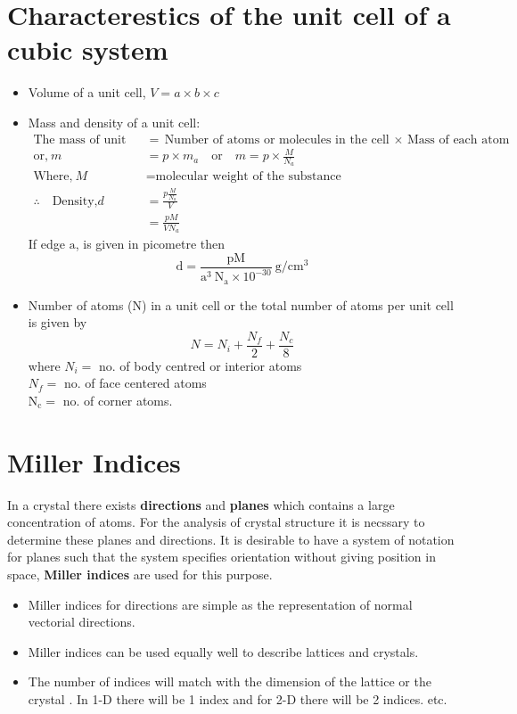 \section{Characterestics of the unit cell of a cubic system}
\begin{itemize}
	\item  Volume of a unit cell, $V=a \times b \times c$
	\item Mass and density of a unit cell:
	\begin{align*}
	\text{The mass of unit cell} &= \text{Number of atoms or molecules in the cell $\times$ Mass of each atom}\\
	\text{or,}\ m&=p \times m_{a}\quad \text{or}\quad  m=p \times \frac{M}{N_{a}} \\
	\text{Where,}\ M&= \text{molecular weight of the substance}\\
	\therefore \quad \text{Density,} d&=\frac{p \frac{M}{N_{a}}}{V}\\&=\frac{p M}{V N_{a}}
	\end{align*}
	If edge $\mathrm{a}$, is given in picometre then
	$$
	\mathrm{d}=\frac{\mathrm{pM}}{\mathrm{a}^{3} \mathrm{~N}_{\mathrm{a}} \times 10^{-30}} \mathrm{~g} / \mathrm{cm}^{3}
	$$
	\item Number of atoms (N) in a unit cell or the total number of atoms per unit cell is given by $$N=N_{i}+\frac{N_{f}}{2}+\frac{N_{c}}{8}$$ where $N_{i}=$ no. of body centred or interior atoms \\$N_{f}=$ no. of face centered atoms\\ $\mathrm{N}_{\mathrm{c}}=$ no. of corner atoms.
\end{itemize}

\section {Miller Indices}
In a crystal there exists \textbf{directions} and \textbf{planes} which contains a large concentration of atoms. For the analysis of crystal structure it is necssary to determine these planes and directions.
It is desirable to have a system of notation for planes such that the system specifies orientation without giving position in space, \textbf{Miller indices} are used for this purpose.
\begin{itemize}
	\item Miller indices for directions are simple as the representation of normal vectorial directions.
	\item Miller indices can be used equally well to describe lattices and crystals.
	\item The number of indices will match with the dimension of the lattice or the crystal . In 1-D there will be 1 index and for 2-D there will be 2 indices. etc.
\end{itemize}
